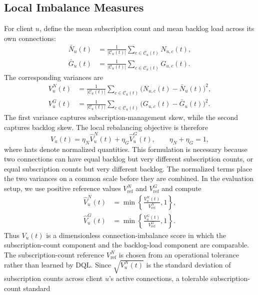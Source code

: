 \documentclass[manuscript,nonacm]{acmart}
\begin{document}
\subsection{Local Imbalance Measures}

For client $u$, define the mean subscription count and mean backlog load across
its own connections:
\begin{align}
	\bar{N}_u(t)
	&= \frac{1}{|\mathcal{C}_u(t)|}
	\sum_{c\in\mathcal{C}_u(t)} N_{u,c}(t),\\
	\bar{G}_u(t)
	&= \frac{1}{|\mathcal{C}_u(t)|}
	\sum_{c\in\mathcal{C}_u(t)} G_{u,c}(t).
\end{align}
The corresponding variances are
\begin{align}
	V^N_u(t)
	&= \frac{1}{|\mathcal{C}_u(t)|}
	\sum_{c\in\mathcal{C}_u(t)}
	\bigl(N_{u,c}(t)-\bar{N}_u(t)\bigr)^2,\\
	V^G_u(t)
	&= \frac{1}{|\mathcal{C}_u(t)|}
	\sum_{c\in\mathcal{C}_u(t)}
	\bigl(G_{u,c}(t)-\bar{G}_u(t)\bigr)^2.
\end{align}
The first variance captures subscription-management skew, while the second
captures backlog skew. The local rebalancing objective is therefore
\begin{equation}
	V_u(t)=
	\eta_N\widehat{V}^N_u(t)
	+\eta_G\widehat{V}^G_u(t),
	\qquad
	\eta_N+\eta_G=1,
	\label{eq:local_connection_imbalance}
\end{equation}
where hats denote normalized quantities. This formulation is necessary because
two connections can have equal backlog but very different subscription counts,
or equal subscription counts but very different backlog.
The normalized terms place the two variances on a common scale before they are
combined. In the evaluation setup, we use positive reference values
$V^N_{\mathrm{ref}}$ and $V^G_{\mathrm{ref}}$ and compute
\begin{align*}
	\widehat{V}^N_u(t)
	&=\min\left\{\frac{V^N_u(t)}{V^N_{\mathrm{ref}}},1\right\},\\
	\widehat{V}^G_u(t)
	&=\min\left\{\frac{V^G_u(t)}{V^G_{\mathrm{ref}}},1\right\}.
\end{align*}
Thus $V_u(t)$ is a dimensionless connection-imbalance score in which the
subscription-count component and the backlog-load component are comparable.
The subscription-count reference $V^N_{\mathrm{ref}}$ is chosen from an
operational tolerance rather than learned by DQL. Since
$\sqrt{V^N_u(t)}$ is the standard deviation of subscription counts across
client $u$'s active connections, a tolerable subscription-count standard
\end{document}
